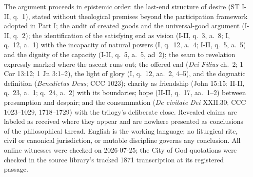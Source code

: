 The argument proceeds in epistemic order: the last-end structure of desire (ST I-II, q.~1), stated without theological premises beyond the participation framework adopted in Part I; the audit of created goods and the universal-good argument (I-II, q.~2); the identification of the satisfying end as vision (I-II, q.~3, a.~8; I, q.~12, a.~1) with the incapacity of natural powers (I, q.~12, a.~4; I-II, q.~5, a.~5) and the dignity of the capacity (I-II, q.~5, a.~5, ad~2); the seam to revelation expressly marked where the ascent runs out; the offered end (\emph{Dei Filius} ch.~2; 1 Cor 13:12; 1 Jn 3:1--2), the light of glory (I, q.~12, aa.~2, 4--5), and the dogmatic definition (\emph{Benedictus Deus}; CCC 1023); charity as friendship (John 15:15; II-II, q.~23, a.~1; q.~24, a.~2) with its boundaries; hope (II-II, q.~17, aa.~1--2) between presumption and despair; and the consummation (\emph{De civitate Dei} XXII.30; CCC 1023--1029, 1718--1729) with the trilogy's deliberate close. Revealed claims are labeled as received where they appear and are nowhere presented as conclusions of the philosophical thread. English is the working language; no liturgical rite, civil or canonical jurisdiction, or mutable discipline governs any conclusion. All online witnesses were checked on 2026-07-25; the City of God quotations were checked in the source library's tracked 1871 transcription at its registered passage.

